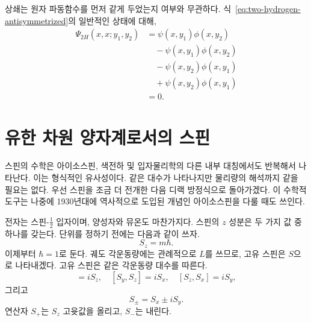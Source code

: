 \begin{classroomqa}
\end{classroomqa}

상쇄는 원자 파동함수를 먼저 같게 두었는지 여부와 무관하다. 식~\eqref{eq:two-hydrogen-antisymmetrized}의 일반적인 상태에 대해,
\begin{align}
\Psi_{2H}(x,x;y_1,y_2)
&=\psi(x,y_1)\phi(x,y_2)\nonumber\\
&\quad{}-\psi(x,y_1)\phi(x,y_2)\nonumber\\
&\quad{}-\psi(x,y_2)\phi(x,y_1)\nonumber\\
&\quad{}+\psi(x,y_2)\phi(x,y_1)\\
&=0.
\end{align}

\begin{classroomqa}
\end{classroomqa}

\section{유한 차원 양자계로서의 스핀}

스핀의 수학은 아이소스핀, 색전하 및 입자물리학의 다른 내부 대칭에서도 반복해서 나타난다. 이는 형식적인 유사성이다. 같은 대수가 나타나지만 물리량의 해석까지 같을 필요는 없다. 우선 스핀을 조금 더 전개한 다음 디랙 방정식으로 돌아가겠다. 이 수학적 도구는 나중에 1930년대에 역사적으로 도입된 개념인 아이소스핀을 다룰 때도 쓰인다.

전자는 스핀-\(\tfrac12\) 입자이며, 양성자와 뮤온도 마찬가지다. 스핀의 \(z\) 성분은 두 가지 값 중 하나를 갖는다. 단위를 정하기 전에는 다음과 같이 쓰자.
\begin{equation}
S_z=m\hbar.
\end{equation}
이제부터 \(\hbar=1\)로 둔다. 궤도 각운동량에는 관례적으로 \(L\)를 쓰므로, 고유 스핀은 \(S\)으로 나타내겠다. 고유 스핀은 같은 각운동량 대수를 따른다.
\begin{equation}
[S_x,S_y]=iS_z,
\quad
[S_y,S_z]=iS_x,
\quad
[S_z,S_x]=iS_y,
\end{equation}
그리고
\begin{equation}
S_\pm=S_x\pm iS_y.
\end{equation}
연산자 \(S_+\)는 \(S_z\) 고윳값을 올리고, \(S_-\)는 내린다.

